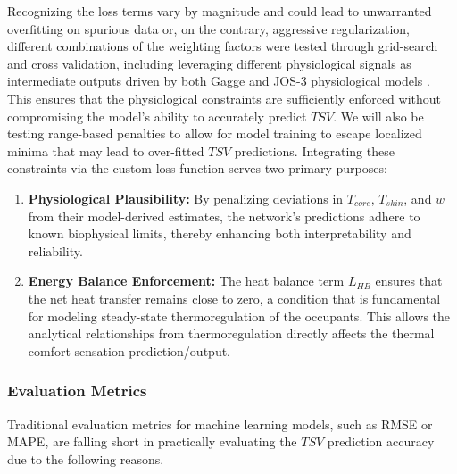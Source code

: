 Recognizing the loss terms vary by magnitude and could lead to unwarranted overfitting on spurious data or, on the contrary, aggressive regularization, different combinations of the weighting factors were tested through grid-search and cross validation, including leveraging different physiological signals as intermediate outputs driven by both Gagge and JOS-3 physiological models . This ensures that the physiological constraints are sufficiently enforced without compromising the model's ability to accurately predict $TSV$. We will also be testing range-based penalties to allow for model training to escape localized minima that may lead to over-fitted $TSV$ predictions. 
Integrating these constraints via the custom loss function serves two primary purposes:
\begin{enumerate}
    \item \textbf{Physiological Plausibility:} By penalizing deviations in $T_{core}$, $T_{skin}$, and $w$ from their model-derived estimates, the network's predictions adhere to known biophysical limits, thereby enhancing both interpretability and reliability. 
    \item \textbf{Energy Balance Enforcement:} The heat balance term $L_{HB}$ ensures that the net heat transfer remains close to zero, a condition that is fundamental for modeling steady-state thermoregulation of the occupants. This allows the analytical relationships from thermoregulation directly affects the thermal comfort sensation prediction/output.
\end{enumerate}

\subsubsection{Evaluation Metrics}
\label{subsubsec:metrics}
Traditional evaluation metrics for machine learning models, such as RMSE or MAPE, are falling short in practically evaluating the $TSV$ prediction accuracy due to the following reasons.

